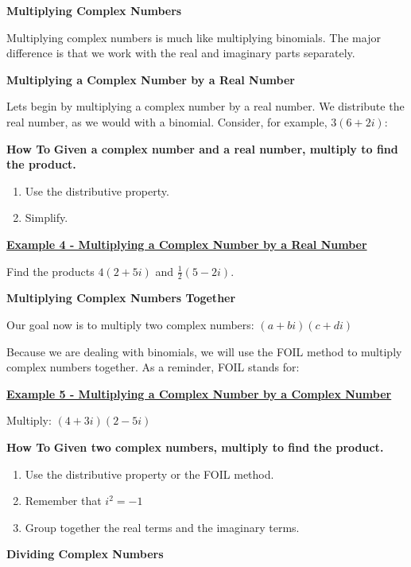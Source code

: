 \documentclass[12pt]{book}
\begin{document}
{\large \textbf{Multiplying Complex Numbers}}
\vspace{3mm}

Multiplying complex numbers is much like multiplying binomials. The major difference is that we work with the real and imaginary parts separately.
\vspace{3mm}

\textbf{Multiplying a Complex Number by a Real Number}

Lets begin by multiplying a complex number by a real number. We 
distribute the real number, as we would with a binomial. Consider, for example,  $3(6+2i)$:

\newpage

\begin{boxR}
    \textbf{How To}
    \vspace{1mm}
    \hline
    \vspace{2mm}
\textbf{Given a complex number and a real number, multiply to find the product.}
\begin{enumerate}
    \item Use the distributive property.
    \item Simplify.
\end{enumerate}
\end{boxR}

\underline{\textbf{Example 4 - Multiplying a Complex Number by a Real Number}}

Find the products $4(2+5i)$ and $\frac{1}{2}(5-2i)$.

\vspace{30mm}

\textbf{Multiplying Complex Numbers Together}

Our goal now is to multiply two complex numbers: $(a+bi)(c+di)$
\vspace{1mm}

Because we are dealing with binomials, we will use the FOIL method to multiply complex numbers together. As a reminder, FOIL stands for: 
\vspace{20mm}

\underline{\textbf{Example 5 - Multiplying a Complex Number by a Complex Number}}

Multiply: $(4+3i)(2-5i)$
\vspace{55mm}
\begin{boxR}
    \textbf{How To}
    \vspace{1mm}
    \hline
    \vspace{2mm}
\textbf{Given two complex numbers, multiply to find the product.}
\begin{enumerate}
    \item  Use the distributive property or the FOIL method.
    \item Remember that $i^2 = -1$
    \item Group together the real terms and the imaginary terms.
\end{enumerate}
\end{boxR}
\newpage
{\large \textbf{Dividing Complex Numbers}}
\vspace{3mm}
\end{document}
